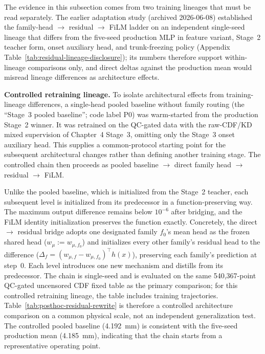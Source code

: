 The evidence in this subsection comes from two training lineages that must be
read separately. The earlier adaptation study (archived 2026-06-08)
established the family-head \(\to\) residual \(\to\) FiLM ladder on an
independent single-seed lineage that differs from the five-seed production MLP
in feature variant, Stage~2 teacher form, onset auxiliary head, and
trunk-freezing policy (Appendix Table~\ref{tab:residual-lineage-disclosure});
its numbers therefore support within-lineage comparisons only, and direct
deltas against the production mean would misread lineage differences as
architecture effects.

\textbf{Controlled retraining lineage.} To isolate architectural effects from
training-lineage differences, a single-head pooled baseline without family
routing (the ``Stage~3 pooled baseline''; code label P0) was warm-started from
the production Stage~2 winner. It was retrained on the QC-gated data with the
raw-CDF/KD mixed supervision of Chapter~4 Stage~3, omitting only the Stage~3
onset auxiliary head. This supplies a common-protocol starting point for the
subsequent architectural changes rather than defining another training stage.
The controlled chain then proceeds as pooled baseline \(\to\) direct family
head \(\to\) residual \(\to\) FiLM.

Unlike the pooled baseline, which is initialized from the Stage~2 teacher,
each subsequent level is initialized from its predecessor in a
function-preserving way. The maximum output difference remains below
\(10^{-6}\) after bridging, and the FiLM identity initialization preserves the
function exactly. Concretely, the direct \(\to\) residual bridge adopts one designated family
\(f_0\)'s mean head as the frozen shared head (\(w_{\mu} := w_{\mu,f_0}\)) and initializes every
other family's residual head to the difference (\(\Delta_f = (w_{\mu,f} - w_{\mu,f_0})^{\top} h(x)\)),
preserving each family's prediction at step~0. Each level introduces one new mechanism and distills from
its predecessor. The chain is single-seed and is evaluated on the same
540{,}367-point QC-gated uncensored CDF fixed table as the primary comparison;
for this controlled retraining lineage, the table includes training
trajectories. Table~\ref{tab:posthoc-residual-rewrite} is therefore a controlled
architecture comparison on a common physical scale, not an independent
generalization test. The controlled pooled baseline (\SI{4.192}{mm}) is
consistent with the five-seed production mean (\SI{4.185}{mm}), indicating
that the chain starts from a representative operating point.

